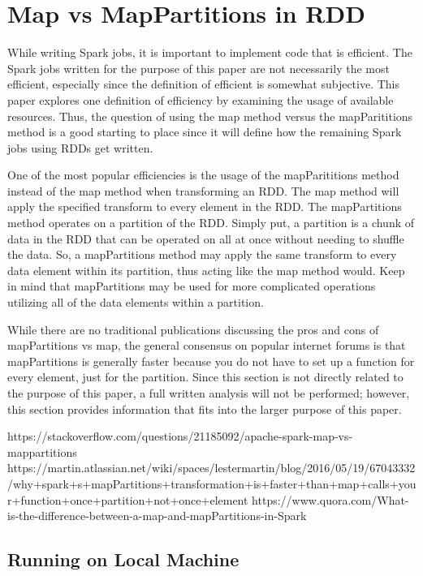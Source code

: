 \documentclass[conference]{IEEEtran}
\begin{document}
\section{Map vs MapPartitions in RDD}
While writing Spark jobs, it is important to implement code that is efficient.
The Spark jobs written for the purpose of this paper are not necessarily the most efficient, especially since the definition of efficient is somewhat subjective.
This paper explores one definition of efficiency by examining the usage of available resources.
Thus, the question of using the map method versus the mapParititions method is a good starting to place since it will define how the remaining Spark jobs using RDDs get written.

One of the most popular efficiencies is the usage of the mapParititions method instead of the map method when transforming an RDD.
The map method will apply the specified transform to every element in the RDD.
The mapPartitions method operates on a partition of the RDD.
Simply put, a partition is a chunk of data in the RDD that can be operated on all at once without needing to shuffle the data.
So, a mapPartitions method may apply the same transform to every data element within its partition, thus acting like the map method would.
Keep in mind that mapPartitions may be used for more complicated operations utilizing all of the data elements within a partition.

While there are no traditional publications discussing the pros and cons of mapPartitions vs map, the general consensus on popular internet forums is that mapPartitions is generally faster because you do not have to set up a function for every element, just for the partition.
Since this section is not directly related to the purpose of this paper, a full written analysis will not be performed; however, this section provides information that fits into the larger purpose of this paper.

https://stackoverflow.com/questions/21185092/apache-spark-map-vs-mappartitions
https://martin.atlassian.net/wiki/spaces/lestermartin/blog/2016/05/19/67043332/why+spark+s+mapPartitions+transformation+is+faster+than+map+calls+your+function+once+partition+not+once+element
https://www.quora.com/What-is-the-difference-between-a-map-and-mapPartitions-in-Spark

\subsection{Running on Local Machine}
\end{document}
